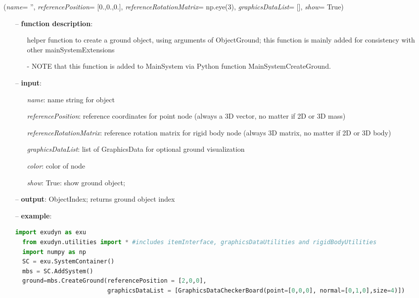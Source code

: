 \begin{flushleft}
\label{sec:mainsystemextensions:CreateGround}
({\it name}= '', {\it referencePosition}= [0.,0.,0.], {\it referenceRotationMatrix}= np.eye(3), {\it graphicsDataList}= [], {\it show}= True)
\end{flushleft}
\setlength{\itemindent}{0.7cm}
\begin{itemize}[leftmargin=0.7cm]
\item[--]
{\bf function description}: \vspace{-6pt}
\begin{itemize}[leftmargin=1.2cm]
\setlength{\itemindent}{-0.7cm}
\item[]helper function to create a ground object, using arguments of ObjectGround; this function is mainly added for consistency with other mainSystemExtensions
\item[]- NOTE that this function is added to MainSystem via Python function MainSystemCreateGround.
\end{itemize}
\item[--]
{\bf input}: \vspace{-6pt}
\begin{itemize}[leftmargin=1.2cm]
\setlength{\itemindent}{-0.7cm}
\item[]{\it name}: name string for object
\item[]{\it referencePosition}: reference coordinates for point node (always a 3D vector, no matter if 2D or 3D mass)
\item[]{\it referenceRotationMatrix}: reference rotation matrix for rigid body node (always 3D matrix, no matter if 2D or 3D body)
\item[]{\it graphicsDataList}: list of GraphicsData for optional ground visualization
\item[]{\it color}: color of node
\item[]{\it show}: True: show ground object;
\end{itemize}
\item[--]
{\bf output}: ObjectIndex; returns ground object index
\item[--]
{\bf example}: \vspace{-12pt}\ei\begin{lstlisting}[language=Python, xleftmargin=36pt]
  import exudyn as exu
  from exudyn.utilities import * #includes itemInterface, graphicsDataUtilities and rigidBodyUtilities
  import numpy as np
  SC = exu.SystemContainer()
  mbs = SC.AddSystem()
  ground=mbs.CreateGround(referencePosition = [2,0,0],
                          graphicsDataList = [GraphicsDataCheckerBoard(point=[0,0,0], normal=[0,1,0],size=4)])
\end{lstlisting}\vspace{-24pt}\bi\item[]\vspace{-24pt}\vspace{12pt}\end{itemize}
%

